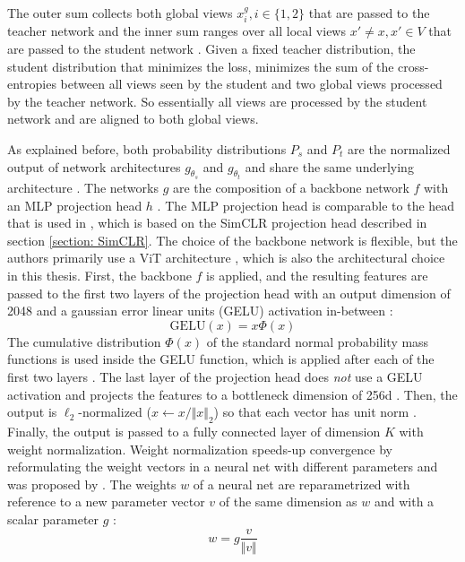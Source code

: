 The outer sum collects both global views $x_i^g, i\in\{1,2\}$ that are passed to the teacher network and the inner sum ranges over all local views $x\prime \neq x, x \prime \in V $ that are passed to the student network \citep{Caron2021}.
Given a fixed teacher distribution, the student distribution that minimizes the loss, minimizes the sum of the cross-entropies between all views seen by the student and two global views processed by the teacher network.
So essentially all views are processed by the student network and are aligned to both global views.
\par
As explained before, both probability distributions $P_s$ and $P_t$ are the normalized output of network architectures $g_{\theta_s}$ and $g_{\theta_t}$ and share the same underlying architecture \citep{Caron2021}.
The networks $g$ are the composition of a backbone network $f$ with an MLP projection head $h$ \citep{Caron2021}.
The MLP projection head is comparable to the head that is used in \citep{Caron2020}, which is based on the SimCLR projection head described in section \ref{section: SimCLR}.
The choice of the backbone network is flexible, but the authors primarily use a ViT architecture \citep{Dosovitskiy2020}, which is also the architectural choice in this thesis.
First, the backbone $f$ is applied, and the resulting features are passed to the first two layers of the projection head with an output dimension of 2048 and a gaussian error linear units (GELU) activation in-between \citep{Hendrycks2016}:
\begin{equation}
\text{GELU}(x) = x \Phi(x)
\end{equation}
The cumulative distribution $\Phi(x)$ of the standard normal probability mass functions is used inside the GELU function, which is applied after each of the first two layers \citep{Hendrycks2016}.
The last layer of the projection head does \textit{not} use a GELU activation and projects the features to a bottleneck dimension of 256d \citep{Caron2021}.
Then, the output is $\ell_2$-normalized ($x \leftarrow x/\Vert x \Vert_2$) so that each vector has unit norm \citep{Caron2021}.
Finally, the output is passed to a fully connected layer of dimension $K$ with weight normalization.
Weight normalization speeds-up convergence by reformulating the weight vectors in a neural net with different parameters and was proposed by \citep{Salimans2016}.
The weights $w$ of a neural net are reparametrized with reference to a new parameter vector $v$ of the same dimension as $w$ and with a scalar parameter $g$ \citep{Salimans2016}:
\begin{equation}
	w = g \frac{v}{\Vert v \Vert}
\end{equation}
